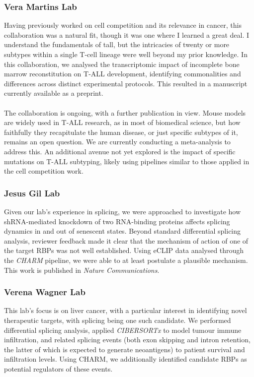 \subsubsection{Vera Martins Lab}
Having previously worked on cell competition and its relevance in cancer, this collaboration was a natural fit, though it was one where I learned a great deal. I understand the fundamentals of \gls{tall}, but the intricacies of twenty or more subtypes within a single T-cell lineage were well beyond my prior knowledge. In this collaboration, we analysed the transcriptomic impact of incomplete bone marrow reconstitution on T-ALL development, identifying commonalities and differences across distinct experimental protocols. This resulted in a manuscript currently available as a preprint\cite{oliveira_limited_2025}.
\\
\\
The collaboration is ongoing, with a further publication in view. Mouse models are widely used in T-ALL research, as in most of biomedical science, but how faithfully they recapitulate the human disease, or just specific subtypes of it, remains an open question. We are currently conducting a meta-analysis to address this. An additional avenue not yet explored is the impact of specific mutations on T-ALL subtyping, likely using pipelines similar to those applied in the cell competition work.
\subsubsection{Jesus Gil Lab}
Given our lab's experience in splicing, we were approached to investigate how shRNA-mediated knockdown of two RNA-binding proteins affects splicing dynamics in and out of senescent states. Beyond standard differential splicing analysis, reviewer feedback made it clear that the mechanism of action of one of the target RBPs was not well established. Using eCLIP data analysed through the \textit{CHARM} pipeline, we were able to at least postulate a plausible mechanism. This work is published in \textit{Nature Communications}\cite{wagner2026spliceosome}.
\subsubsection{Verena Wagner Lab}
This lab's focus is on liver cancer, with a particular interest in identifying novel therapeutic targets, with splicing being one such candidate. We performed differential splicing analysis, applied \textit{CIBERSORTx}\cite{chen_profiling_2018} to model tumour immune infiltration, and related splicing events (both exon skipping and intron retention, the latter of which is expected to generate neoantigens) to patient survival and infiltration levels. Using CHARM, we additionally identified candidate RBPs as potential regulators of these events.
